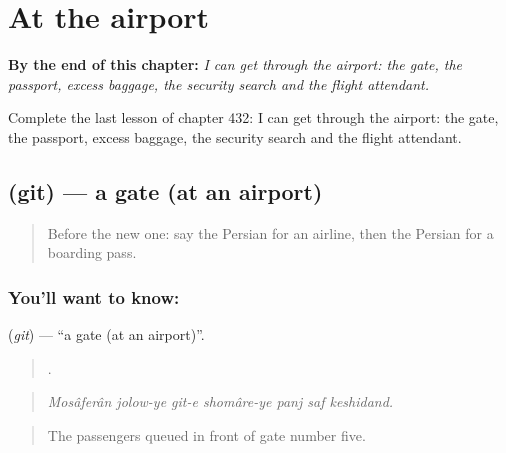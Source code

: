 
\chapter{At the airport}
\label{ch:fa-at-the-airport}

\begin{chapteropening}
\textbf{By the end of this chapter:} \emph{I can get through the airport: the gate, the passport, excess baggage, the security search and the flight attendant.}

Complete the last lesson of chapter 432: I can get through the airport: the gate, the passport, excess baggage, the security search and the flight attendant.
\end{chapteropening}

\section[\texorpdfstring{\fa{گیت} (git)}{گیت (git)}]{ (git) — a gate (at an airport)}

\label{lesson:FA-C432-git}



\begin{quote}
Before the new one: say the Persian for an airline, then the Persian for a boarding pass.
\end{quote}

\subsection*{You'll want to know: }
\textbf{} (\emph{git}) — \textquotedblleft{}a gate (at an airport)\textquotedblright{}.

\begin{quote}
      .
\end{quote}

\begin{quote}
\emph{Mosâferân jolow-ye git-e shomâre-ye panj saf keshidand.}
\end{quote}

\begin{quote}
The passengers queued in front of gate number five.
\end{quote}

